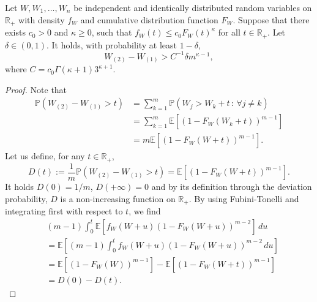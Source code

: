\documentclass[10pt,a4paper]{amsart}
\newcommand{\PP}{\mathbb{P}}
\begin{document}
\begin{lemma}\label{kappa}
     Let $W,W_1,\ldots, W_n$ be independent and identically distributed random variables on $\mathbb R_{+}$ with density $f_W$ and cumulative distribution function $F_W$. Suppose that there exists $c_0>0$ and $\kappa \geq 0$, such that  $ f_W (t) \leq c_0 F_W(t) ^{\kappa} $ for all $t\in  \mathbb R_{+} $. 
     Let $\delta \in (0,1) $. It holds, with probability at least $1-\delta $, 
   $$ W_{(2)} -W_{(1)} >    C^{-1} \delta  m^{ \kappa-1 }  ,$$ 
   where $C=  c_0 \Gamma(\kappa+1) 3^{\kappa+1}.$
\end{lemma}

\begin{proof}
    Note that 
\begin{align*}
 \PP (W_{(2)} -W_{(1)}   > t ) &= \sum_{k=1} ^ m \mathbb P (  W_j > W_k + t \, : \, \forall  j \neq k) \\
 &= \sum_{k=1} ^ m \mathbb E [  (1- F_W ( W_k + t ))^{m-1} ]\\
 &= m \mathbb E [   (1- F_W ( W + t ))^{m-1} ].
  \end{align*}
Let us define, 
for any $t\in \mathbb{R}_+$,
\begin{equation*}
    D(t):= \frac{1}{m}\mathbb{P}(W_{(2)}-W_{(1)}>t) =  \mathbb E [   (1- F_W ( W + t ))^{m-1}  ].
\end{equation*}
It holds $D(0)=1/m$, $D(+\infty)=0$ and by its definition through the deviation probability, $D$ is a non-increasing function on $\mathbb{R}_+$. 
By using Fubini-Tonelli and integrating first with respect to $t$, we find
\begin{align*}
    &(m-1)\int_0^t \mathbb{E}[f_W(W+u)(1- F_W ( W + u ))^{m-2}] \, du \\ 
    &= \mathbb E\left[ (m-1)\int_0^t f_W(W+u)(1- F_W ( W + u ))^{m-2} \, du \right] \\ &= \mathbb E [   (1- F_W ( W ))^{m-1}  ] - \mathbb E [   (1- F_W ( W + t ))^{m-1}  ] \\ &= D(0)-D(t).

\end{align*}
\end{proof}
\end{document}
